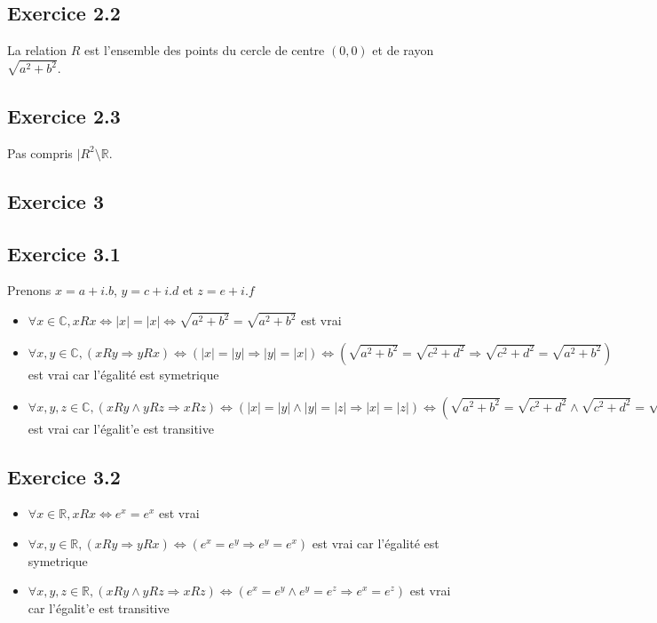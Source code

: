 \documentclass[]{book}
\theoremstyle{definition}
\newcommand{\bb}[1]{\mathbb{#1}}
\newcommand{\R}{\bb{R}}
\newcommand{\C}{\bb{C}}
\begin{document}
\subsection*{Exercice 2.2}
La relation $R$ est l'ensemble des points du cercle de centre $(0,0)$ et de rayon $\sqrt{a^2+b^2}$.

\subsection*{Exercice 2.3}
Pas compris $|R^2\setminus\R$.


\subsection*{Exercice 3}
\subsection*{Exercice 3.1}
Prenons $x=a+i.b$, $y=c+i.d $ et $z=e+i.f$
\begin{itemize}
\item $\forall x \in \C, xRx \Leftrightarrow |x| = |x| \Leftrightarrow \sqrt{a^2+b^2} = \sqrt{a^2+b^2} $  est vrai
\item $\forall x,y \in \C, (xRy \Rightarrow yRx) \Leftrightarrow (|x| = |y| \Rightarrow |y| = |x|) \Leftrightarrow (\sqrt{a^2+b^2} = \sqrt{c^2+d^2} \Rightarrow \sqrt{c^2+d^2} = \sqrt{a^2+b^2})$ est vrai car l'\'egalit\'e est symetrique
\item $\forall x,y,z \in \C, (xRy \wedge yRz \Rightarrow xRz) \Leftrightarrow (|x| = |y| \wedge |y| = |z| \Rightarrow |x| = |z|) \Leftrightarrow (\sqrt{a^2+b^2} = \sqrt{c^2+d^2} \wedge \sqrt{c^2+d^2} = \sqrt{e^2+f^2} \Rightarrow \sqrt{a^2+b^2} = \sqrt{e^2+f^2})$ est vrai car l'\'egalit'e est transitive
\end{itemize}


\subsection*{Exercice 3.2}
\begin{itemize}
\item $\forall x \in \R, xRx \Leftrightarrow e^x = e^x$ est vrai
\item $\forall x,y \in \R, (xRy \Rightarrow yRx) \Leftrightarrow (e^x = e^y \Rightarrow e^y = e^x)$ est vrai car l'\'egalit\'e est symetrique
\item $\forall x,y,z \in \R, (xRy \wedge yRz \Rightarrow xRz) \Leftrightarrow (e^x = e^y \wedge e^y = e^z \Rightarrow e^x = e^z)$ est vrai car l'\'egalit'e est transitive
\end{itemize}
\end{document}
